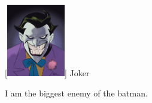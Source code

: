 \begin{IEEEbiography}
	[{\includegraphics[width=1in,height=1.25in,clip,keepaspectratio]{./biographies/joker.jpg}}]	
	{Joker}
	
	I am the biggest enemy of the batman.
	
\end{IEEEbiography}